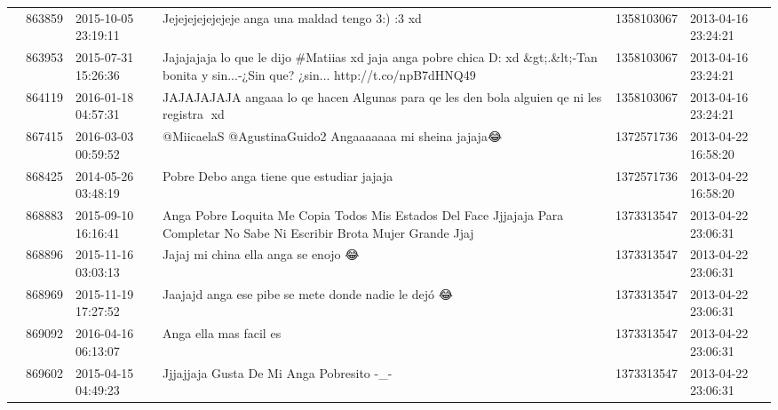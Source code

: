 \begin{tabular}{llllrl}
           & 863859  & 2015-10-05 23:19:11 &                                                                                             Jejejejejejejeje anga una maldad tengo 3:) :3 xd &  1358103067 & 2013-04-16 23:24:21 \\
           & 863953  & 2015-07-31 15:26:36 &     Jajajajaja lo que le dijo \#Matiias xd jaja anga pobre chica D: xd \&gt;.\&lt;-Tan bonita y sin...-¿Sin que? ¿sin... http://t.co/npB7dHNQ49 &  1358103067 & 2013-04-16 23:24:21 \\
           & 864119  & 2016-01-18 04:57:31 &                                                  JAJAJAJAJA angaaa lo qe hacen Algunas para qe les den bola alguien qe ni les registra 󾮟xd󾌴󾌴 &  1358103067 & 2013-04-16 23:24:21 \\
           & 867415  & 2016-03-03 00:59:52 &                                                                                      @MiicaelaS @AgustinaGuido2 Angaaaaaaa mi sheina jajaja😂 &  1372571736 & 2013-04-22 16:58:20 \\
           & 868425  & 2014-05-26 03:48:19 &                                                                                                    Pobre Debo anga tiene que estudiar jajaja &  1372571736 & 2013-04-22 16:58:20 \\
           & 868883  & 2015-09-10 16:16:41 &                 Anga Pobre Loquita Me Copia Todos Mis Estados Del Face Jjjajaja  Para Completar No Sabe Ni Escribir Brota Mujer Grande  Jjaj &  1373313547 & 2013-04-22 23:06:31 \\
           & 868896  & 2015-11-16 03:03:13 &                                                                                                          Jajaj mi china ella anga se enojo 😂 &  1373313547 & 2013-04-22 23:06:31 \\
           & 868969  & 2015-11-19 17:27:52 &                                                                                          Jaajajd anga ese pibe se mete donde nadie le dejó 😂 &  1373313547 & 2013-04-22 23:06:31 \\
           & 869092  & 2016-04-16 06:13:07 &                                                                                                                       Anga ella mas facil es &  1373313547 & 2013-04-22 23:06:31 \\
           & 869602  & 2015-04-15 04:49:23 &                                                                                                     Jjjajjaja Gusta De Mi Anga Pobresito -\_- &  1373313547 & 2013-04-22 23:06:31 \\

\end{tabular}
